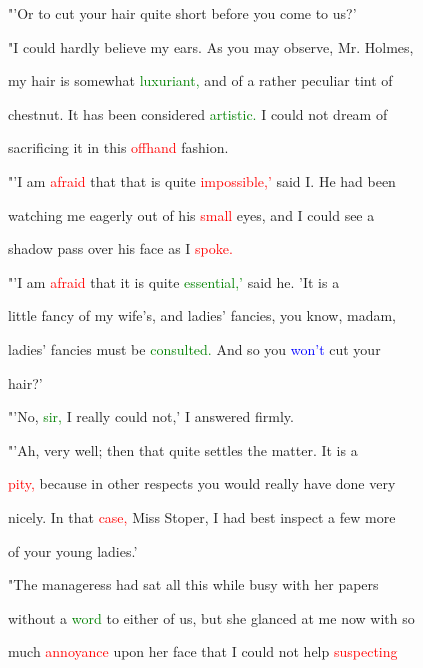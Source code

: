 "'Or to cut your hair quite short before you come to us?'



 "I could hardly believe my ears. As you may observe, Mr. Holmes,

 my hair is somewhat \textcolor{green}{luxuriant,} and of a rather peculiar tint of

 chestnut. It has been considered \textcolor{green}{artistic.} I could not dream of

 sacrificing it in this \textcolor{red}{offhand} fashion.



 "'I am \textcolor{red}{afraid} that that is quite \textcolor{red}{impossible,'} said I. He had been

 \textcolor{BurntOrange}{watching} me eagerly out of his \textcolor{red}{small} eyes, and I could see a

 shadow pass over his face as I \textcolor{red}{spoke.}



 "'I am \textcolor{red}{afraid} that it is quite \textcolor{green}{essential,'} said he. 'It is a

 little \textcolor{BurntOrange}{fancy} of my wife's, and ladies' \textcolor{BurntOrange}{fancies,} you know, madam,

 ladies' \textcolor{BurntOrange}{fancies} must be \textcolor{green}{consulted.} And so you \textcolor{blue}{won't} cut your

 hair?'



 "'No, \textcolor{green}{sir,} I really could not,' I answered firmly.



 "'Ah, very well; then that quite settles the matter. It is a

 \textcolor{red}{pity,} because in other \textcolor{BurntOrange}{respects} you would really have done very

 nicely. In that \textcolor{red}{case,} Miss Stoper, I had best inspect a few more

 of your \textcolor{BurntOrange}{young} ladies.'



 "The manageress had sat all this while busy with her papers

 without a \textcolor{green}{word} to either of us, but she glanced at me now with so

 much \textcolor{red}{annoyance} upon her face that I could not help \textcolor{red}{suspecting}

